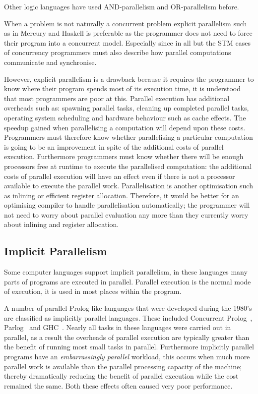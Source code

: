 Other logic languages have used AND-parallelism and OR-parallelism before.


When a problem is not naturally a concurrent problem 
explicit parallelism such as in Mercury and Haskell
is preferable as the programmer does not need to force their program
into a concurrent model.
Especially since in all but the STM cases of concurrency programmers
must also describe how parallel computations communicate and
synchronise.

However, explicit parallelism is a drawback because it requires the
programmer to know where their program spends most of its execution
time, it is understood that most programmers are poor at this.
Parallel execution has additional overheads such as:
spawning parallel tasks,
cleaning up completed parallel tasks,
operating system scheduling and
hardware behaviour such as cache effects.
The speedup gained when parallelising a computation will depend upon
these costs.
Programmers must therefore know whether parallelising a particular
computation is going to be an improvement in spite of the additional
costs of parallel execution.
Furthermore programmers must know whether there will be enough
processors free at runtime to execute the parallelised computation:
the additional costs of parallel execution will have an effect even
if there is not a processor available to execute the parallel work.
Parallelisation is another optimisation such as inlining or efficient
register allocation.
Therefore,
it would be better for an optimising compiler to handle parallelisation
automatically;
the programmer will not need to worry about parallel evaluation any more
than they currently worry about inlining and register allocation.

\subsection{Implicit Parallelism}
\label{sec:intro_implicit_par}

Some computer languages support implicit parallelism,
in these languages many parts of programs are executed in parallel.
Parallel execution is the normal mode of execution,
it is used in most places within the program.

A number of parallel Prolog-like languages that were developed during the
1980's are classified as implicitly parallel languages.
These included Concurrent
Prolog~\citep{saraswat85:probl_with_concur_prolog,saraswat86:concurrent_prolog_definition,shapiro:flat_concur_prolog},
Parlog~\citep{clark:84:parlog_sys_prog,clark:86:parlog} and GHC~\citep{ueda:ghc}.
Nearly all tasks in these languages were carried out in
parallel,
as a result the overheads of parallel execution are typically
greater than the benefit of running most small tasks in parallel.
Furthermore implicitly parallel programs have an \emph{embarrassingly
  parallel} workload,
this occurs when much more parallel work is available than the parallel
processing capacity of the machine;
thereby dramatically reducing the benefit of parallel execution while
the cost remained the same.
Both these effects often caused very poor performance.

